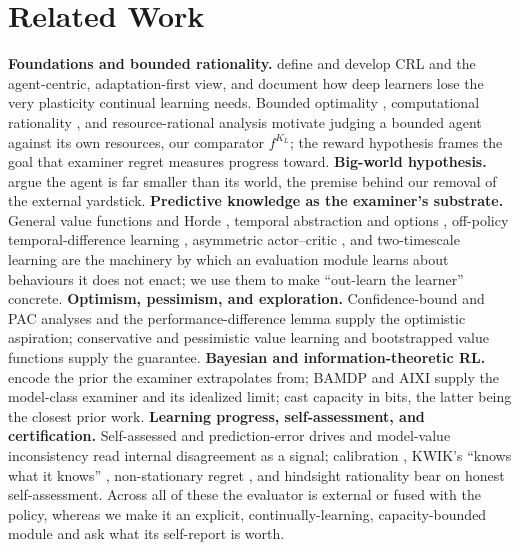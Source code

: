 \documentclass[10pt]{article} %
\theoremstyle{definition}
\theoremstyle{plain}
\begin{document}
\section{Related Work}
\label{sec:related}

\textbf{Foundations and bounded rationality.} \citet{ring1994continual,abel2023definition,abel2024dogmas,abel2020bounded} define and develop CRL and the agent-centric, adaptation-first view, and \citet{dohare2024plasticity} document how deep learners lose the very plasticity continual learning needs. Bounded optimality \citep{simon1955behavioral,russell1995bounded}, computational rationality \citep{lewis2014computational}, and resource-rational analysis \citep{lieder2020resource} motivate judging a bounded agent against its own resources, our comparator $f^{K_L}$; the reward hypothesis \citep{silver2021reward} frames the goal that examiner regret measures progress toward.
\textbf{Big-world hypothesis.} \citet{javed2025bigworld,lewandowski2025bigger} argue the agent is far smaller than its world, the premise behind our removal of the external yardstick.
\textbf{Predictive knowledge as the examiner's substrate.} General value functions and Horde \citep{sutton2011horde,modayil2014nexting}, temporal abstraction and options \citep{suttonprecupsingh1999}, off-policy temporal-difference learning \citep{precup2001offpolicy}, asymmetric actor--critic \citep{pinto2018asymmetric}, and two-timescale learning \citep{konda2000actorcritic,borkar1997twotimescale} are the machinery by which an evaluation module learns about behaviours it does not enact; we use them to make ``out-learn the learner'' concrete.
\textbf{Optimism, pessimism, and exploration.} Confidence-bound and PAC analyses \citep{kearns2002e3,brafman2002rmax,jaksch2010ucrl2,auer2002ucb,strehl2009pacmdp,azar2017minimax} and the performance-difference lemma \citep{kakade2002cpi} supply the optimistic aspiration; conservative and pessimistic value learning \citep{kumar2020cql,jin2021pessimism} and bootstrapped value functions \citep{osband2016bootstrapped} supply the guarantee.
\textbf{Bayesian and information-theoretic RL.} \citet{osband2013psrl,russo2017ids} encode the prior the examiner extrapolates from; BAMDP and AIXI \citep{guez2012bamcp,lidayan2025bampf,hutter2005aixi} supply the model-class examiner and its idealized limit; \citet{lu2021bitbybit,arumugam2024capacity} cast capacity in bits, the latter being the closest prior work.
\textbf{Learning progress, self-assessment, and certification.} Self-assessed and prediction-error drives \citep{schmidhuber2010formal,oudeyer2007intrinsic,bellemare2016count,pathak2017curiosity,burda2019rnd} and model-value inconsistency \citep{filos2022modelvalue} read internal disagreement as a signal; calibration \citep{foster1998calibration}, KWIK's ``knows what it knows'' \citep{li2011kwik}, non-stationary regret \citep{wei2021master}, and hindsight rationality \citep{morrill2021hindsight} bear on honest self-assessment. Across all of these the evaluator is external or fused with the policy, whereas we make it an explicit, continually-learning, capacity-bounded module and ask what its self-report is worth.
\end{document}
